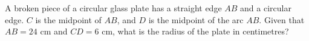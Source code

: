 A broken piece of a circular glass plate has a straight edge $AB$ and a circular edge. $C$ is the midpoint of $AB$, and $D$ is the midpoint of the arc $AB$. Given that $AB=24$ cm and $CD=6$ cm, what is the radius of the plate in centimetres?
